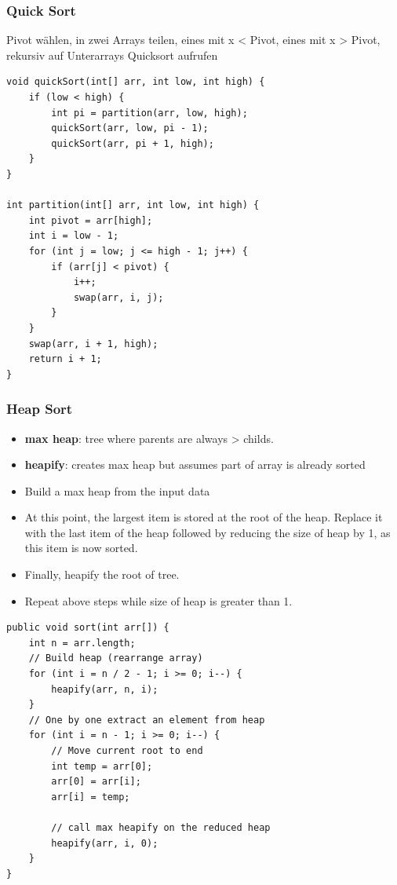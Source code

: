 \begin{multicols*}{4}
		\subsubsection{Quick Sort}
		Pivot wählen, in zwei Arrays teilen, eines mit x < Pivot, eines mit x > Pivot, rekursiv auf Unterarrays Quicksort aufrufen
			\begin{lstlisting}
void quickSort(int[] arr, int low, int high) {
	if (low < high) {
		int pi = partition(arr, low, high);
		quickSort(arr, low, pi - 1);
		quickSort(arr, pi + 1, high);
	}
}
	
int partition(int[] arr, int low, int high) {
	int pivot = arr[high];
	int i = low - 1;
	for (int j = low; j <= high - 1; j++) {
		if (arr[j] < pivot) {
			i++;
			swap(arr, i, j);
		}
	}
	swap(arr, i + 1, high);
	return i + 1;
}
			\end{lstlisting}

		\subsubsection{Heap Sort}
			\begin{itemize}
				\item \textbf{max heap}: tree where parents are always > childs.
				\item \textbf{heapify}: creates max heap but assumes part of array is already sorted
				\item Build a max heap from the input data
				\item At this point, the largest item is stored at the root of the heap. Replace it with the last item of the heap followed by reducing the size of heap by 1, as this item is now sorted.
				\item Finally, heapify the root of tree.
				\item Repeat above steps while size of heap is greater than 1.			
			\end{itemize}
		
			\vspace{2pt}
			\begin{lstlisting}
public void sort(int arr[]) { 
	int n = arr.length; 
	// Build heap (rearrange array) 
	for (int i = n / 2 - 1; i >= 0; i--) {
		heapify(arr, n, i); 
	}
	// One by one extract an element from heap 
	for (int i = n - 1; i >= 0; i--) { 
		// Move current root to end 
		int temp = arr[0]; 
		arr[0] = arr[i]; 
		arr[i] = temp; 
		
		// call max heapify on the reduced heap 
		heapify(arr, i, 0); 
	} 
} 


\end{lstlisting}
\end{multicols*}
